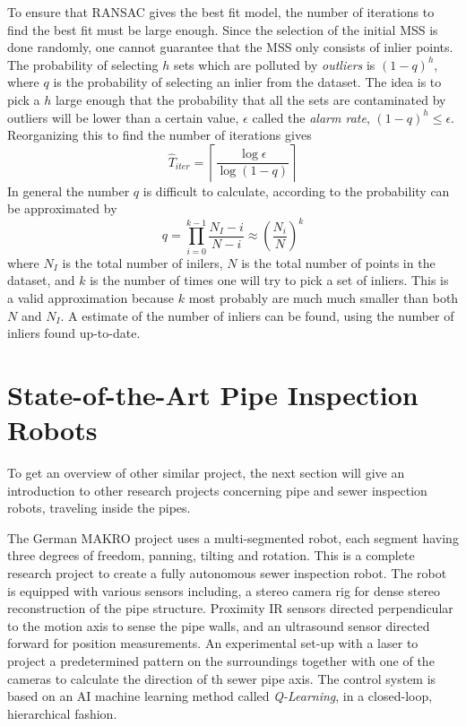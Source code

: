To ensure that RANSAC gives the best fit model, the number of iterations to find the best
fit must be large enough. Since the selection of the initial MSS is done randomly, one
cannot guarantee that the MSS only consists of inlier points. The probability of
selecting $h$ sets which are polluted by \emph{outliers} is $(1 - q)^h$, where $q$ is the
probability of selecting an inlier from the dataset. The idea is to pick a $h$ large enough that the
probability that all the sets are contaminated by outliers will be lower than a certain
value, $\epsilon$ called the \emph{alarm rate}, $(1 - q)^h \leq \epsilon$. Reorganizing
this to find the number of iterations gives
\begin{equation}
    \hat{T}_{iter} = \left \lceil \frac{\log \epsilon}{\log (1 - q)} \right\rceil
\end{equation}
In general the number $q$ is difficult to calculate, according to \cite{ransac-dummies}
the probability can be approximated by 
\begin{equation}
    q = \prod_{i = 0}^{k-1} \frac{N_I - i}{N - i} \approx \left ( \frac{N_i}{N} \right)^k
\end{equation}
where $N_I$ is the total number of inilers, $N$ is the total number of points in the
dataset, and $k$ is the number of times one will try to pick a set of inliers. This is a
valid approximation because $k$ most probably are much much smaller than both $N$ and $N_I$. A
estimate of the number of inliers can be found, using the number of inliers found
up-to-date. \cite{ransac-dummies}


\section{State-of-the-Art Pipe Inspection Robots}
\label{chap2:sec-state-of-the-art}
To get an overview of other similar project, the next section will give an introduction to
other research projects concerning pipe and sewer inspection robots, traveling inside the
pipes. 

The German MAKRO project \cite{MAKRO-project} uses a multi-segmented robot, each segment 
having three degrees of freedom, panning, tilting and rotation. This is a complete
research project to create a fully autonomous sewer inspection robot. The robot is
equipped with various sensors including, a stereo camera rig for dense stereo
reconstruction of the pipe structure. Proximity IR sensors directed perpendicular to the
motion axis to sense the pipe walls, and an ultrasound sensor directed forward for
position measurements. An experimental set-up with a laser to project a predetermined
pattern on the surroundings together with one of the cameras to calculate the direction of
th sewer pipe axis. The control system is based on an AI machine learning method called \emph{Q-Learning}, in
a closed-loop, hierarchical fashion.


